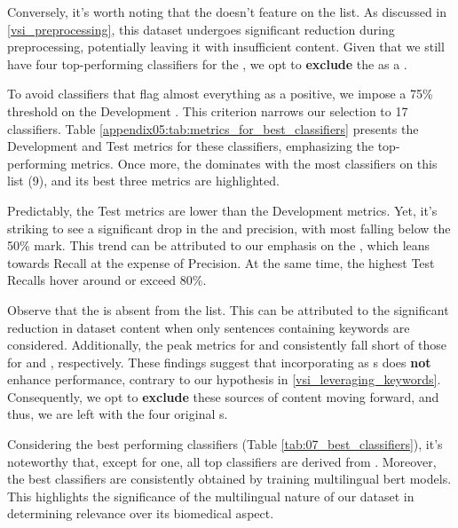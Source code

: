 Conversely, it's worth noting that the \keyphrasesAbstractOnly{} doesn't feature on the list. 
As discussed in \headerName{} \ref{vsi_preprocessing}, this dataset undergoes significant reduction during preprocessing, potentially leaving it with insufficient content.
Given that we still have four top-performing classifiers for the \trafilaturaAbstract{}, we opt to \textbf{exclude} the \keyphrasesAbstractOnly{} as a \contentType{}.


To avoid classifiers that flag almost everything as a positive, we impose a 75\% threshold on the Development \fOne{}.
This criterion narrows our selection to 17 classifiers. 
Table \ref{appendix05:tab:metrics_for_best_classifiers} presents the Development and Test metrics for these classifiers, emphasizing the top-performing metrics.
Once more, the \trafilaturaFulltext{} dominates with the most classifiers on this list (9), and its best three metrics are highlighted.

Predictably, the Test metrics are lower than the Development metrics. 
Yet, it's striking to see a significant drop in the \fOne{} and precision, with most falling below the 50\% mark. 
This trend can be attributed to our emphasis on the \fTwo{}, which leans towards Recall at the expense of Precision. At the same time, the highest Test Recalls hover around or exceed 80\%.


Observe that the \keyphrasesFulltextOnly{} is absent from the list. 
This can be attributed to the significant reduction in dataset content when only sentences containing keywords are considered. 
Additionally, the peak metrics for \keyphrasesAbstractOC{} and \keyphrasesFulltextOC{} consistently fall short of those for \trafilaturaAbstract{} and \trafilaturaFulltext{}, respectively.
These findings suggest that incorporating \keyphrases{} as \contentType{}s does \textbf{not} enhance performance, contrary to our hypothesis in \headerName{} \ref{vsi_leveraging_keywords}. 
Consequently, we opt to \textbf{exclude} these sources of content moving forward, and thus, we are left with the four original \contentType{}s.


Considering the best performing classifiers (Table \ref{tab:07_best_classifiers}), it's noteworthy that, except for one, all top classifiers are derived from \petThousand{}.
Moreover, the best classifiers are consistently obtained by training multilingual \gls{bert} models. This highlights the significance of the multilingual nature of our dataset in determining relevance over its biomedical aspect.


